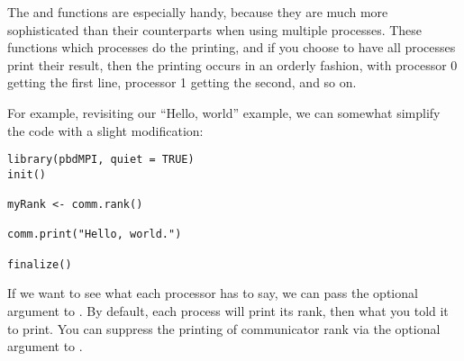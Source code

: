 The  and  functions are especially handy, because they are much more sophisticated than their  counterparts when using multiple processes.  These functions which processes do the printing, and if you choose to have all processes print their result, then the printing occurs in an orderly fashion, with processor 0 getting the first line, processor 1 getting the second, and so on.

For example, revisiting our ``Hello, world'' example, we can somewhat simplify the code with a slight modification:

\begin{lstlisting}[language=rr,title=Simple pbdMPI Example 3]
library(pbdMPI, quiet = TRUE)
init()

myRank <- comm.rank()

comm.print("Hello, world.")

finalize()
\end{lstlisting}

If we want to see what each processor has to say, we can pass the optional argument  to .  By default, each process will print its rank, then what you told it to print.  You can suppress the printing of communicator rank via the optional argument  to .

